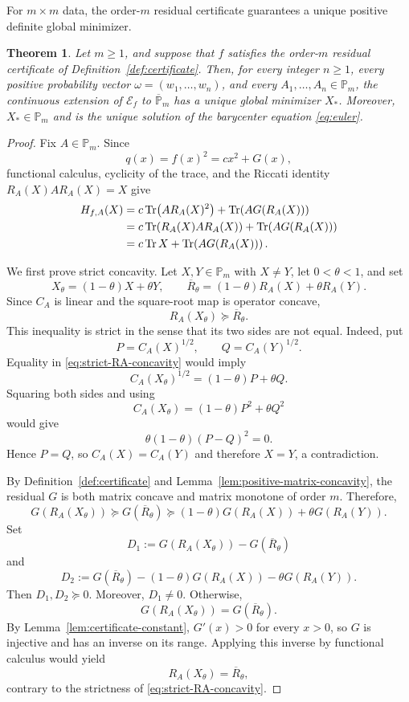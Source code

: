 \documentclass[11pt]{amsart}
\newtheorem{theorem}{Theorem}[section]
\theoremstyle{definition}
\theoremstyle{remark}
\newcommand{\Pm}{\mathbb P_m}
\newcommand{\Tr}{\operatorname{Tr}}
\begin{document}
	
For $m\times m$ data, the order-$m$ residual certificate guarantees a
unique positive definite global minimizer.

\begin{theorem}
	\label{thm:certificate}
	Let $m\ge1$, and suppose that $f$ satisfies the order-$m$ residual
	certificate of Definition~\ref{def:certificate}.  Then, for every
	integer $n\ge1$, every positive probability vector
	$\omega=(w_1,\ldots,w_n)$, and every
	$A_1,\ldots,A_n\in\Pm$, the continuous extension of
	$\mathcal E_f$ to $\overline{\mathbb{P}}_m$ has a unique global minimizer
	$X_*$.  Moreover, $X_*\in\Pm$ and is the unique solution of the
	barycenter equation \eqref{eq:euler}.
\end{theorem}
	
 \begin{proof}
		Fix $A\in\Pm$.  Since
		\[
		q(x)=f(x)^2=cx^2+G(x),
		\]
		functional calculus, cyclicity of the trace, and the Riccati identity
		$R_A(X)AR_A(X)=X$ give
		\begin{align}
			H_{f,A}(X)
			&=c\Tr\!\left(AR_A(X)^2\right)
			+\Tr\!\left(AG(R_A(X))\right) \notag\\
			&=c\Tr\!\left(R_A(X)AR_A(X)\right)
			+\Tr\!\left(AG(R_A(X))\right) \notag\\
			&=c\Tr X+\Tr\!\left(AG(R_A(X))\right).
			\label{eq:H-residual}
		\end{align}
		
		We first prove strict concavity.  Let $X,Y\in\Pm$ with $X\ne Y$,
		let $0<\theta<1$, and set
		\[
		X_\theta=(1-\theta)X+\theta Y,
		\qquad
		\overline R_\theta
		=(1-\theta)R_A(X)+\theta R_A(Y).
		\]
		Since $C_A$ is linear and the square-root map is operator concave,
		\begin{equation}\label{eq:strict-RA-concavity}
			R_A(X_\theta)\succeq\overline R_\theta.
		\end{equation}
		This inequality is strict in the sense that its two sides are not
		equal.  Indeed, put
		\[
		P=C_A(X)^{1/2},
		\qquad
		Q=C_A(Y)^{1/2}.
		\]
		Equality in \eqref{eq:strict-RA-concavity} would imply
		\[
		C_A(X_\theta)^{1/2}
		=(1-\theta)P+\theta Q.
		\]
		Squaring both sides and using
		\[
		C_A(X_\theta)
		=(1-\theta)P^2+\theta Q^2
		\]
		would give
		\[
		\theta(1-\theta)(P-Q)^2=0.
		\]
		Hence $P=Q$, so $C_A(X)=C_A(Y)$ and therefore $X=Y$, a
		contradiction.
		
		By Definition~\ref{def:certificate} and
		Lemma~\ref{lem:positive-matrix-concavity}, the residual $G$ is both
		matrix concave and matrix monotone of order $m$.  Therefore,
		\[
		G(R_A(X_\theta))
		\succeq G(\overline R_\theta)
		\succeq
		(1-\theta)G(R_A(X))+\theta G(R_A(Y)).
		\]
		Set
		\[
		D_1
		:=G(R_A(X_\theta))-G(\overline R_\theta)
		\]
		and
		\[
		D_2
		:=G(\overline R_\theta)
		-(1-\theta)G(R_A(X))-\theta G(R_A(Y)).
		\]
		Then $D_1,D_2\succeq0$.  Moreover, $D_1\ne0$.  Otherwise,
		\[
		G(R_A(X_\theta))=G(\overline R_\theta).
		\]
		By Lemma~\ref{lem:certificate-constant}, $G'(x)>0$ for every $x>0$,
		so $G$ is injective and has an inverse on its range.  Applying this
		inverse by functional calculus would yield
		\[
		R_A(X_\theta)=\overline R_\theta,
		\]
		contrary to the strictness of \eqref{eq:strict-RA-concavity}.
		

\end{proof}
\end{document}
